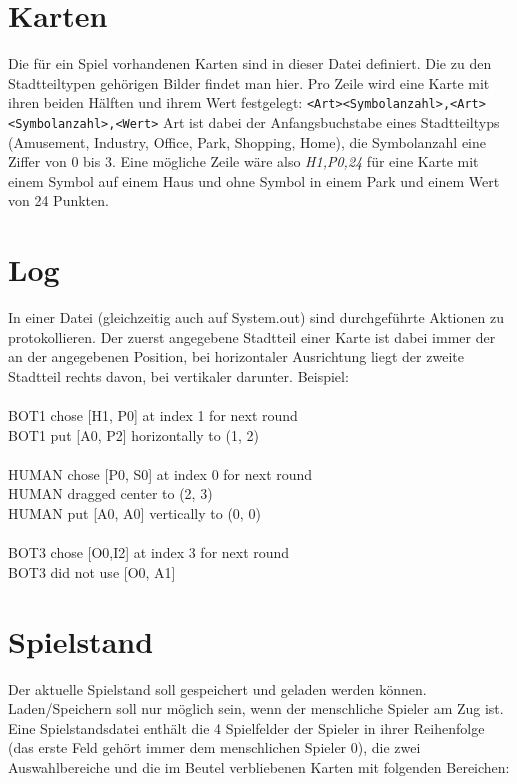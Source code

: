 \section{Karten}
Die für ein Spiel vorhandenen Karten sind in dieser Datei definiert. Die zu den Stadtteiltypen gehörigen Bilder findet man hier.
Pro Zeile wird eine Karte mit ihren beiden Hälften und ihrem Wert festgelegt:
\verb|<Art><Symbolanzahl>,<Art><Symbolanzahl>,<Wert>|
Art ist dabei der Anfangsbuchstabe eines Stadtteiltyps (Amusement, Industry, Office, Park, Shopping, Home), die Symbolanzahl eine Ziffer von 0 bis 3. Eine mögliche Zeile wäre also \emph{H1,P0,24}
für eine Karte mit einem Symbol auf einem Haus und ohne Symbol in einem Park und einem Wert von 24 Punkten.

\section{Log}
In einer Datei (gleichzeitig auch auf System.out) sind durchgeführte Aktionen zu protokollieren. Der zuerst angegebene Stadtteil einer Karte ist dabei immer der an der angegebenen Position, bei horizontaler Ausrichtung liegt der zweite Stadtteil rechts davon, bei vertikaler darunter. Beispiel:\\
\\BOT1 chose [H1, P0] at index 1 for next round
\\BOT1 put [A0, P2] horizontally to (1, 2)\\
\\HUMAN chose [P0, S0] at index 0 for next round
\\HUMAN dragged center to (2, 3)
\\HUMAN put [A0, A0] vertically to (0, 0)\\
\\BOT3 chose [O0,I2] at index 3 for next round
\\BOT3 did not use [O0, A1]

\section{Spielstand}
Der aktuelle Spielstand soll gespeichert und geladen werden können. Laden/Speichern soll nur möglich sein, wenn der menschliche Spieler am Zug ist. Eine Spielstandsdatei enthält die 4 Spielfelder der Spieler in ihrer Reihenfolge (das erste Feld gehört immer dem menschlichen Spieler 0), die zwei Auswahlbereiche und die im Beutel verbliebenen Karten mit folgenden Bereichen:\\

